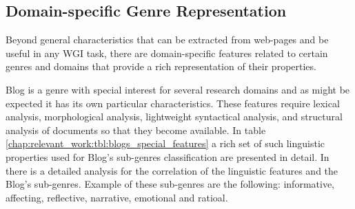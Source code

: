 \subsection{Domain-specific Genre Representation}

Beyond general characteristics that can be extracted from web-pages and be useful in any WGI task, there are domain-specific features related to certain genres and domains that provide a rich representation of their properties.

Blog is a genre with special interest for several research domains and as might be expected it has its own particular characteristics. These features require lexical analysis, morphological analysis, lightweight syntactical analysis, and structural analysis of documents so that they become available. In table \ref{chap:relevant_work:tbl:blogs_special_features} a rich set of such linguistic properties used for Blog's sub-genres classification are presented in detail. In \parencite{virik2017blog} there is a detailed analysis for the correlation of the linguistic features and the Blog's sub-genres. Example of these sub-genres are the following: informative, affecting, reflective, narrative, emotional and ratioal.

